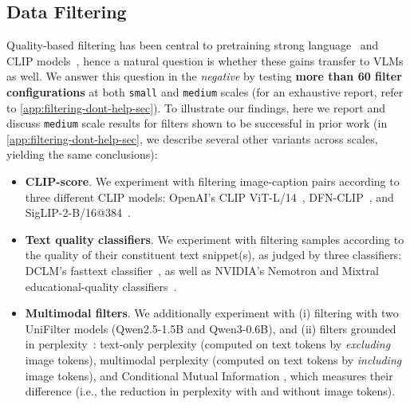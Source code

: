 \subsection{Data Filtering}\label{sec:filtering}
Quality-based filtering has been central to pretraining strong language~\citep{li2024datacomp,penedo2024fineweb,olmo20242,olmo2025olmo} and CLIP models~\citep{gadre2023datacomp,fang2023data,udandarao2025active,evans2024data}, hence a natural question is whether these gains transfer to VLMs as well.
We answer this question in the \emph{negative} 
by testing \textbf{more than 60 filter configurations} at both \texttt{small} and \texttt{medium} scales (for an exhaustive report, refer to {\cref{app:filtering-dont-help-sec}}). 
To illustrate our findings, here we report and discuss \texttt{medium} scale results for filters shown to be successful in prior work (in {\cref{app:filtering-dont-help-sec}}, we describe several other variants across scales, yielding the same conclusions):
\begin{itemize}[leftmargin=*, itemsep=2pt, topsep=0pt, parsep=0pt, partopsep=0pt]
    \item \textbf{CLIP-score}. We experiment with filtering image-caption pairs according to three different CLIP models: OpenAI's CLIP ViT-L/14~\citep{radford2021learning}, DFN-CLIP~\citep{fang2023data}, and SigLIP-2-B/16@384~\citep{tschannen2025siglip}. 
    \item \textbf{Text quality classifiers}. We experiment with filtering samples according to the quality of their constituent text snippet(s), as judged by three classifiers: DCLM's fasttext classifier~\cite{li2024datacomp}, as well as NVIDIA's Nemotron and Mixtral educational-quality classifiers~\cite{su2025nemotron}. 
    \item \textbf{Multimodal filters}. We additionally experiment with (i) filtering with two UniFilter models \cite{wang2025unifilter} (Qwen2.5-1.5B and Qwen3-0.6B), and (ii) filters grounded in perplexity~\citep{ankner2024perplexed}: text-only perplexity (computed on text tokens by \textit{excluding} image tokens), multimodal perplexity (computed on text tokens by \textit{including} image tokens), and Conditional Mutual Information \cite{lee2026selective}, which measures their difference (i.e., the reduction in perplexity with and without image tokens).
\end{itemize}


